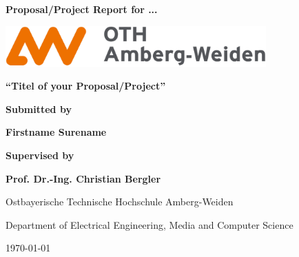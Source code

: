 \documentclass{article}
\begin{document}
\begin{titlepage}
  \begin{center}
    \vspace*{2cm}

    {\Huge\bfseries Proposal/Project Report for ...}

    \vspace{1.5cm}

    \includegraphics[width = 10cm]{assets/oth.png}

    \vspace{1.5cm}

    {\Large\bfseries ``Titel of your Proposal/Project''}

    \vspace{2cm}

    {\small\bfseries Submitted by}

    \vspace{0.25cm}

    {\Large\bfseries Firstname Surename}

    \vspace{1cm}

    {\small\bfseries Supervised by}

    \vspace{0.25cm}

    {\Large\bfseries Prof. Dr.-Ing. Christian Bergler}

    \vspace{2cm}

    \begin{center}
      {\small Ostbayerische Technische Hochschule Amberg-Weiden}

      {\small Department of Electrical Engineering, Media and Computer Science}
    \end{center}

    \vfill

    {\large\today}
  \end{center}
\end{titlepage}
\end{document}
